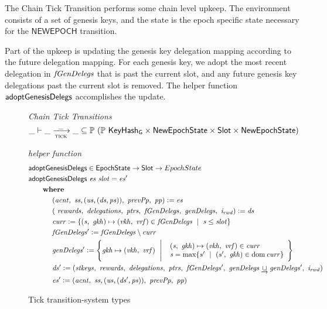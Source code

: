 The Chain Tick Transition performs some chain level
upkeep. The environment consists of a set of genesis keys, and the state is the
epoch specific state necessary for the $\mathsf{NEWEPOCH}$ transition.

Part of the upkeep is updating the genesis key delegation mapping
according to the future delegation mapping.
For each genesis key, we adopt the most recent delegation in $\mathit{fGenDelegs}$
that is past the current slot, and any future genesis key delegations past the current
slot is removed. The helper function $\mathsf{adoptGenesisDelegs}$ accomplishes the update.

\begin{figure}
  \emph{Chain Tick Transitions}
  \begin{equation*}
    \_ \vdash \var{\_} \trans{tick}{\_} \var{\_} \subseteq
    \powerset (\powerset{\KeyHashGen} \times \NewEpochState \times \Slot \times \NewEpochState)
  \end{equation*}
  \caption{Tick transition-system types}
  \label{fig:ts-types:tick}
  \emph{helper function}
  \begin{align*}
      & \mathsf{adoptGenesisDelegs} \in \mathsf{EpochState} \to \mathsf{Slot} \to EpochState
      \\
      & \mathsf{adoptGenesisDelegs}~\mathit{es}~\mathit{slot} = \mathit{es'}
      \\
      & ~~~~~ ~ \mathbf{where}~ ~ 
      \\
      & ~~~~~~~~~~
      (\mathit{acnt},~\mathit{ss},(\mathit{us},(\mathit{ds},\mathit{ps})),~\mathit{prevPp},~\mathit{pp})
      \mathrel{\mathop:}=\mathit{es}
      \\
      & ~~~~~~~~~~
      (~\mathit{rewards},~\mathit{delegations},~\mathit{ptrs},
      ~\mathit{fGenDelegs},~\mathit{genDelegs},~\mathit{i_{rwd}})\mathrel{\mathop:}=\mathit{ds}
      \\
      & ~~~~~~~~~~\mathit{curr}\mathrel{\mathop:}=
        \{
          (\mathit{s},~\mathit{gkh})\mapsto(\mathit{vkh},~\mathit{vrf})\in\mathit{fGenDelegs}
          ~\mid~
          \mathit{s}\leq\mathit{slot}
        \}
      \\
      & ~~~~~~~~~~\mathit{fGenDelegs'}\mathrel{\mathop:}=
          \mathit{fGenDelegs}\setminus\mathit{curr}
      \\
      & ~~~~~~~~~~\mathit{genDelegs'}\mathrel{\mathop:}=
          \left\{
            \mathit{gkh}\mapsto(\mathit{vkh},~\mathit{vrf})
            ~\mathrel{\Bigg|}~
            {
              \begin{array}{l}
                (\mathit{s},~\mathit{gkh})\mapsto(\mathit{vkh},~\mathit{vrf})\in\mathit{curr}\\
                \mathit{s}=\max\{s'~\mid~(s',~\mathit{gkh})\in\operatorname{dom}{\mathit{curr}}\}
              \end{array}
            }
          \right\}
      \\
      & ~~~~~~~~~~\mathit{ds'}\mathrel{\mathop:}=
          (\mathit{stkeys},~\mathit{rewards},~\mathit{delegations},~\mathit{ptrs},
          ~\mathit{fGenDelegs'},~\mathit{genDelegs}\mathbin{\underrightarrow\cup}\mathit{genDelegs'},~\mathit{i_{rwd}})
      \\
      & ~~~~~~~~~~\mathit{es'}\mathrel{\mathop:}=
      (\mathit{acnt},~\mathit{ss},(\mathit{us},(\mathit{ds'},\mathit{ps})),~\mathit{prevPp},~\mathit{pp})
  \end{align*}
\end{figure}

